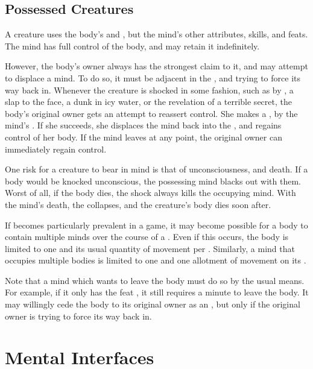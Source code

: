 \subsection{Possessed Creatures}

A {\possessed} creature uses the body's  and , but the {\possessing} mind's other attributes, skills, and feats.
The {\possessing} mind has full control of the body, and may retain it indefinitely.

However, the body's owner always has the strongest claim to it, and may attempt to displace a {\possessing} mind.
To do so, it must be adjacent in the {\mentalrealm}, and trying to force its way back in.
Whenever the {\possessing} creature is shocked in some fashion, such as by {\damage}, a slap to the face, a dunk in icy water, or the revelation of a terrible secret, the body's original owner gets an attempt to reassert control.
She makes a  {\test}, {\opposed} by the {\possessing} mind's  {\test}.
If she succeeds, she displaces the {\possessing} mind back into the {\mentalrealm}, and regains control of her body.
If the {\possessing} mind leaves at any point, the original owner can immediately regain control.

One risk for a {\possessing} creature to bear in mind is that of unconsciousness, and death.
If a body would be knocked unconscious, the possessing mind blacks out with them.
Worst of all, if the body dies, the shock always kills the occupying mind.
With the mind's death, the {\lifeline} collapses, and the {\possessing} creature's body dies soon after.

If {\possession} becomes particularly prevalent in a game, it may become possible for a body to contain multiple minds over the course of a {\round}.
Even if this occurs, the body is limited to one {\action} and its usual quantity of movement per {\round}.
Similarly, a mind that occupies multiple bodies is limited to one {\action} and one allotment of movement on its {\turn}.

Note that a {\possessing} mind which wants to leave the body must do so by the usual means.
For example, if it only has the feat , it still requires a minute to leave the body.
It may willingly cede the body to its original owner as an {\action}, but only if the original owner is trying to force its way back in.

\section{Mental Interfaces}

